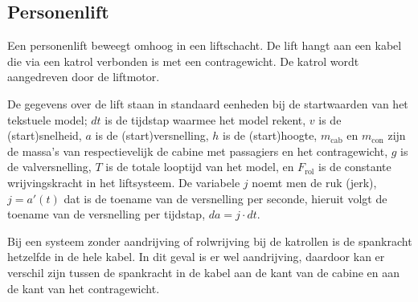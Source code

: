 \documentclass{exam}
\begin{document}
\subsection*{Personenlift}






\mstop{\liftT >= \liftTmax}

Een personenlift beweegt omhoog in een liftschacht. De lift hangt aan een
kabel die via een katrol verbonden is met een contragewicht. De katrol
wordt aangedreven door de liftmotor.

De gegevens over de lift staan in standaard eenheden bij de startwaarden
van het tekstuele model; $dt$ is de tijdstap waarmee het model rekent,
$v$ is de (start)snelheid, $a$ is de (start)versnelling, $h$ is de
(start)hoogte, $m_{\text{cab}}$ en $m_{\text{con}}$ zijn de massa's van
respectievelijk de cabine met passagiers en het contragewicht, $g$ is de
valversnelling, $T$ is de totale looptijd van het model, en
$F_{\text{rol}}$ is de constante wrijvingskracht in het liftsysteem. De
variabele $j$ noemt men de ruk (jerk), $j=a'(t)$ dat is de toename van
de versnelling per seconde, hieruit volgt de toename van de versnelling
per tijdstap, $da = j \cdot dt$.

Bij een systeem zonder aandrijving of rolwrijving bij de katrollen is de
spankracht hetzelfde in de hele kabel. In dit geval is er wel
aandrijving, daardoor kan er verschil zijn tussen de spankracht in de
kabel aan de kant van de cabine en aan de kant van het contragewicht.
\end{document}
